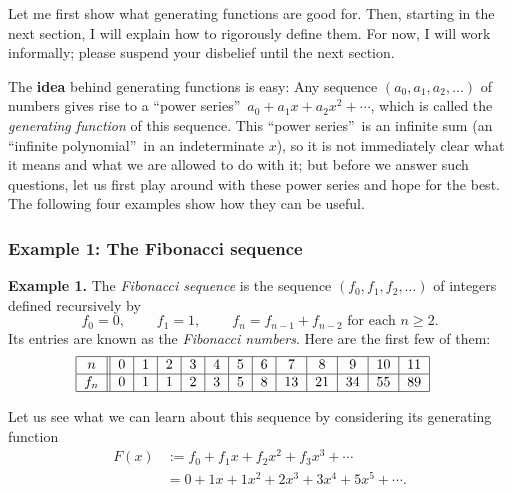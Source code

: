 Let me first show what generating functions are good for. Then, starting in
the next section, I will explain how to rigorously define them. For now, I
will work informally; please suspend your disbelief until the next section.

The \textbf{idea} behind generating functions is easy: Any sequence $\left(
a_{0},a_{1},a_{2},\ldots\right)  $ of numbers gives rise to a
\textquotedblleft power series\textquotedblright\ $a_{0}+a_{1}x+a_{2}%
x^{2}+\cdots$, which is called the \emph{generating function} of this
sequence. This \textquotedblleft power series\textquotedblright\ is an
infinite sum (an \textquotedblleft infinite polynomial\textquotedblright\ in
an indeterminate $x$), so it is not immediately clear what it means and what
we are allowed to do with it; but before we answer such questions, let us
first play around with these power series and hope for the best. The following
four examples show how they can be useful.

\subsubsection{Example 1: The Fibonacci sequence}

\textbf{Example 1.} The \emph{Fibonacci sequence} is the sequence $\left(
f_{0},f_{1},f_{2},\ldots\right)  $ of integers defined recursively by%
\[
f_{0}=0,\ \ \ \ \ \ \ \ \ \ f_{1}=1,\ \ \ \ \ \ \ \ \ \ f_{n}=f_{n-1}%
+f_{n-2}\text{ for each }n\geq2.
\]
Its entries are known as the \emph{Fibonacci numbers}. Here are the first few
of them:%
\[%
\begin{tabular}
[c]{|c||c|c|c|c|c|c|c|c|c|c|c|c|}\hline
$n$ & $0$ & $1$ & $2$ & $3$ & $4$ & $5$ & $6$ & $7$ & $8$ & $9$ & $10$ &
$11$\\\hline
$f_{n}$ & $0$ & $1$ & $1$ & $2$ & $3$ & $5$ & $8$ & $13$ & $21$ & $34$ & $55$
& $89$\\\hline
\end{tabular}
\ \ \
\]


Let us see what we can learn about this sequence by considering its generating
function%
\begin{align*}
F\left(  x\right)   &  :=f_{0}+f_{1}x+f_{2}x^{2}+f_{3}x^{3}+\cdots\\
&  =0+1x+1x^{2}+2x^{3}+3x^{4}+5x^{5}+\cdots.
\end{align*}


